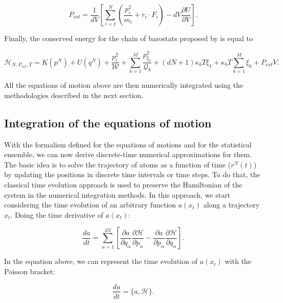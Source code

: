 \begin{equation}
P_{int} = \frac{1}{dV} \left[\sum_{i=1}^{N} \left(\frac{p_{i}^2}{m_i} + r_{i}\cdot F_i \right) - dV \frac{\partial U}{\partial V}\right].
\end{equation}


Finally, the conserved energy for the chain of barostats proposed by  is equal to

\begin{equation}
\mathcal{H}_{N,P_{ext},T} =  K(p^{N}) + U(q^{N})  + \frac{p_{\epsilon}^2}{\mathcal{W}}+\sum_{k=1}^{M }\frac{p^{2}_{\xi _{k}}}{\mathcal{Q} _{k}} + (dN+1)\kappa_{b}T \xi _{1}  + \kappa_{b}T\sum_{k=1}^{M}  \xi _{k} + P_{ext}V.
\end{equation}

All the equations of motion above are then numerically integrated  using the methodologies described in the next section.

\subsection{Integration of the equations of motion}

With the formalism defined for the equations of motions and for the statistical ensemble, we can now derive discrete-time numerical approximations for them.  The basic idea is to solve the trajectory of atoms as a function of time ($r^{N}(t)$) by updating the positions in discrete time intervals or time steps. To do that, the classical time evolution approach is used to preserve the Hamiltonian of the system in the numerical integration methods. In this approach, we start considering the time evolution of an arbitrary function $a(x_{t})$ along a trajectory $x_{t}$. Doing the time derivative of $a(x_{t})$:

\begin{equation}
\frac{da}{dt} = \sum_{\alpha=1}^{3N} \left [ \dfrac{\partial a}{\partial q_{\alpha}} \dfrac{\partial \mathcal{H}}{\partial p_{\alpha}}  - \dfrac{\partial a}{\partial p_{\alpha}} \dfrac{\partial \mathcal{H}}{\partial q_{\alpha}} \right].
\label{eqn:operador}
\end{equation}

In the equation above, we can represent the time evolution of $a(x_{t})$ with  the Poisson bracket:

\begin{equation}
\frac{da}{dt} = \{a,\mathcal{H}\}.
\end{equation}

